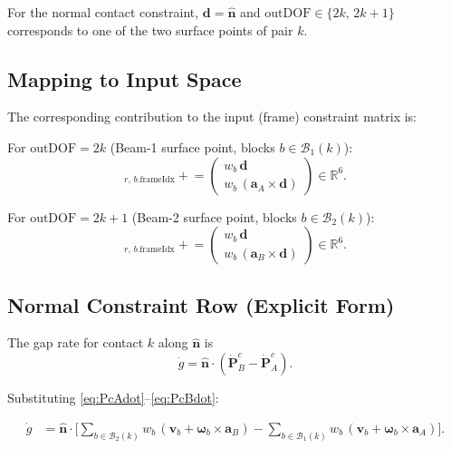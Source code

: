 \documentclass[11pt, a4paper]{article}
\newcommand{\vv}[1]{\bm{#1}}
\newcommand{\nn}{\hat{\vv{n}}}
\begin{document}
For the normal contact constraint, $\vv{d} = \nn$ and
$\text{outDOF} \in \{2k,\, 2k+1\}$ corresponds to one of the two
surface points of pair $k$.

\subsection{Mapping to Input Space}

The corresponding contribution to the input (frame) constraint matrix is:

For $\text{outDOF} = 2k$ (Beam-1 surface point, blocks $b \in \mathcal{B}_1(k)$):
\begin{equation}
  [\text{In1MatrixDeriv}]_{r,\, b.\text{frameIdx}}
  \mathrel{+}=
  \begin{pmatrix} w_b\,\vv{d} \\ w_b\,(\vv{a}_A \times \vv{d}) \end{pmatrix}
  \in \mathbb{R}^6.
  \label{eq:in1_constraint}
\end{equation}

For $\text{outDOF} = 2k+1$ (Beam-2 surface point, blocks $b \in \mathcal{B}_2(k)$):
\begin{equation}
  [\text{In2MatrixDeriv}]_{r,\, b.\text{frameIdx}}
  \mathrel{+}=
  \begin{pmatrix} w_b\,\vv{d} \\ w_b\,(\vv{a}_B \times \vv{d}) \end{pmatrix}
  \in \mathbb{R}^6.
  \label{eq:in2_constraint}
\end{equation}

\subsection{Normal Constraint Row (Explicit Form)}

The gap rate for contact $k$ along $\nn$ is
\begin{equation}
  \dot{g} = \nn \cdot (\dot{\vv{P}}^c_B - \dot{\vv{P}}^c_A).
  \label{eq:gdot}
\end{equation}

Substituting \eqref{eq:PcAdot}--\eqref{eq:PcBdot}:

\begin{align}
  \dot{g}
  &= \nn \cdot \Biggl[
    \sum_{b \in \mathcal{B}_2(k)} w_b\,(\vv{v}_b + \bm{\omega}_b \times \vv{a}_B)
    -
    \sum_{b \in \mathcal{B}_1(k)} w_b\,(\vv{v}_b + \bm{\omega}_b \times \vv{a}_A)
  \Biggr].
  \label{eq:gdot_expanded}
\end{align}
\end{document}
